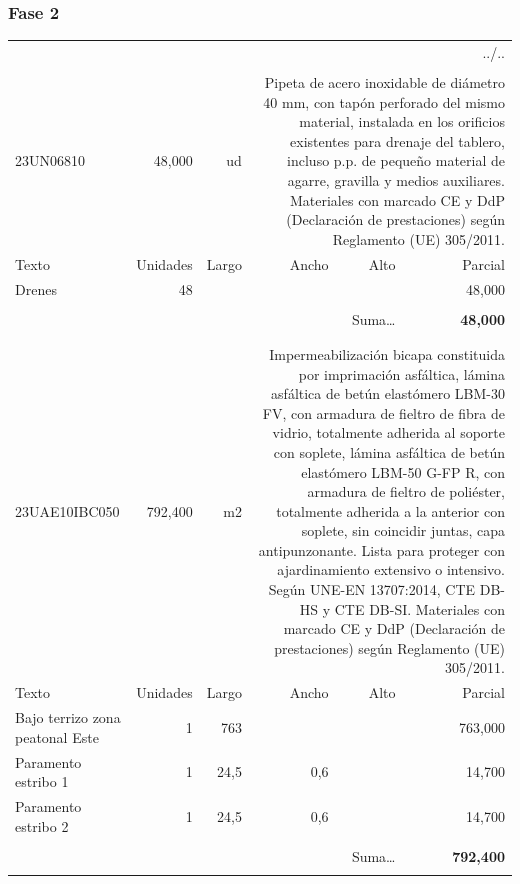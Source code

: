 \documentclass{book}%
\begin{document}
%
\subsubsection{Fase 2}%
\begin{longtable}{lrrrrr}%
\multicolumn{6}{r}{../..}\\%
\endfoot%
\endlastfoot%
&&&&&\\%
23UN06810&    48,000& ud&\multicolumn{3}{p{6cm}}{\scriptsize Pipeta de acero inoxidable de diámetro 40 mm, con tapón perforado del mismo material, instalada en los orificios existentes para drenaje del tablero, incluso p.p. de pequeño material de agarre, gravilla y medios auxiliares. Materiales con marcado CE y DdP (Declaración de prestaciones) según Reglamento (UE) 305/2011.\normalsize}\\%
Texto&Unidades&Largo&Ancho&Alto&Parcial\\%
\hline%
\multicolumn{1}{p{3.5cm}}{Drenes}&48&&&&    48,000\\%
&&&&&\\%
\multicolumn{5}{r}{Suma\ldots}&\textbf{    48,000}\\%
\hline%
&&&&&\\%
&&&&&\\%
23UAE10IBC050&   792,400& m2&\multicolumn{3}{p{6cm}}{\scriptsize Impermeabilización bicapa constituida por imprimación asfáltica, lámina asfáltica de betún elastómero LBM-30 FV, con armadura de fieltro de fibra de vidrio, totalmente adherida al soporte con soplete, lámina asfáltica de betún elastómero LBM-50 G-FP R, con armadura de fieltro de poliéster, totalmente adherida a la anterior con soplete, sin coincidir juntas, capa antipunzonante. Lista para proteger con ajardinamiento extensivo o intensivo. Según UNE-EN 13707:2014, CTE DB-HS y CTE DB-SI. Materiales con marcado CE y DdP (Declaración de prestaciones) según Reglamento (UE) 305/2011.\normalsize}\\%
Texto&Unidades&Largo&Ancho&Alto&Parcial\\%
\hline%
\multicolumn{1}{p{3.5cm}}{Bajo terrizo zona peatonal Este }&1&763&&&   763,000\\%
\multicolumn{1}{p{3.5cm}}{Paramento estribo 1}&1&24,5&0,6&&    14,700\\%
\multicolumn{1}{p{3.5cm}}{Paramento estribo 2}&1&24,5&0,6&&    14,700\\%
&&&&&\\%
\multicolumn{5}{r}{Suma\ldots}&\textbf{   792,400}\\%
\hline%
&&&&&\\%
\end{longtable}%
\newpage
\end{document}
